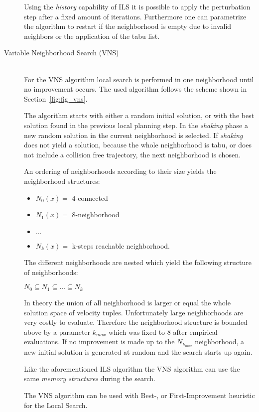 \begin{description}
Using the \emph{history} capability of ILS it is possible to apply the perturbation step after a fixed amount of iterations. 
Furthermore one can parametrize the algorithm to restart if the neighborhood is empty due to invalid neighbors or the application of the tabu list. 


\item[Variable Neighborhood Search (VNS)]\hfill \\
For the VNS algorithm local search is performed in one neighborhood until no improvement occurs.
The used algorithm follows the scheme shown in Section~\ref{fig:fig_vns}.

The algorithm starts with either a random initial solution, or with the best solution found in the previous local planning step. 
In the \emph{shaking} phase a new random solution in the current neighborhood is selected. 
If \emph{shaking} does not yield a solution, because the whole neighborhood is tabu, or does not include a collision free trajectory, the next neighborhood is chosen. 

An ordering of neighborhoods according to their size yields the neighborhood structures:
\begin{itemize}
 \item $N_0(x)=$ 4-connected
 \item $N_1(x)=$ 8-neighborhood
 \item $\dots$
 \item $N_k(x)=$ k-steps reachable neighborhood.
\end{itemize}
The different neighborhoods are nested which yield the following structure of neighborhoods:

$N_0 \subseteq N_1 \subseteq \dots \subseteq N_k$

In theory the union of all neighborhood is larger or equal the whole solution space of velocity tuples.
Unfortunately large neighborhoods are very costly to evaluate. 
Therefore the neighborhood structure is bounded above by a parameter $k_{max}$ which was fixed to 8 after empirical evaluations. 
If no improvement is made up to the $N_{k_{max}}$ neighborhood, a new initial solution is generated at random and the search starts up again.

Like the aforementioned ILS algorithm the VNS algorithm can use the same \emph{memory structures} during the search.

The VNS algorithm can be used with Best-, or First-Improvement heuristic for the Local Search.
\end{description}




